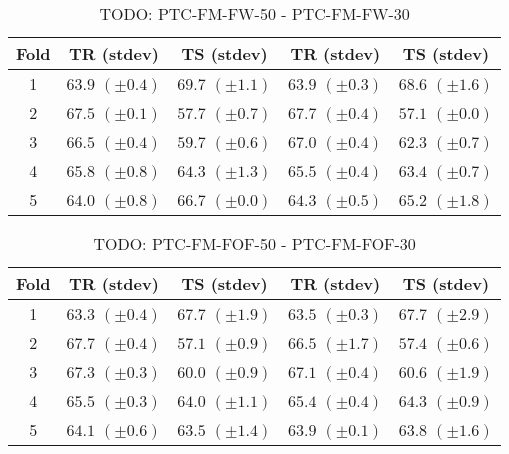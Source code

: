 \documentclass[10pt,a4paper]{book}
\begin{document}
\begin{table}[tbph]
\caption{TODO: PTC-FM-FW-50 - PTC-FM-FW-30}
\label{TODO}
\centering
\begin{tabular}{c*{4}{c}}
\toprule
Fold & TR (stdev) & TS (stdev) & TR (stdev) & TS (stdev)\\
\midrule
1 & $63.9$ $(\pm 0.4)$ & $69.7$ $(\pm 1.1)$ & $63.9$ $(\pm 0.3)$ & $68.6$ $(\pm 1.6)$\\
2 & $67.5$ $(\pm 0.1)$ & $57.7$ $(\pm 0.7)$ & $67.7$ $(\pm 0.4)$ & $57.1$ $(\pm 0.0)$\\
3 & $66.5$ $(\pm 0.4)$ & $59.7$ $(\pm 0.6)$ & $67.0$ $(\pm 0.4)$ & $62.3$ $(\pm 0.7)$\\
4 & $65.8$ $(\pm 0.8)$ & $64.3$ $(\pm 1.3)$ & $65.5$ $(\pm 0.4)$ & $63.4$ $(\pm 0.7)$\\
5 & $64.0$ $(\pm 0.8)$ & $66.7$ $(\pm 0.0)$ & $64.3$ $(\pm 0.5)$ & $65.2$ $(\pm 1.8)$\\
\bottomrule
\end{tabular}
\end{table}



\begin{table}[tbph]
\caption{TODO: PTC-FM-FOF-50 - PTC-FM-FOF-30}
\label{TODO}
\centering
\begin{tabular}{c*{4}{c}}
\toprule
Fold & TR (stdev) & TS (stdev) & TR (stdev) & TS (stdev)\\
\midrule
1 & $63.3$ $(\pm 0.4)$ & $67.7$ $(\pm 1.9)$ & $63.5$ $(\pm 0.3)$ & $67.7$ $(\pm 2.9)$\\
2 & $67.7$ $(\pm 0.4)$ & $57.1$ $(\pm 0.9)$ & $66.5$ $(\pm 1.7)$ & $57.4$ $(\pm 0.6)$\\
3 & $67.3$ $(\pm 0.3)$ & $60.0$ $(\pm 0.9)$ & $67.1$ $(\pm 0.4)$ & $60.6$ $(\pm 1.9)$\\
4 & $65.5$ $(\pm 0.3)$ & $64.0$ $(\pm 1.1)$ & $65.4$ $(\pm 0.4)$ & $64.3$ $(\pm 0.9)$\\
5 & $64.1$ $(\pm 0.6)$ & $63.5$ $(\pm 1.4)$ & $63.9$ $(\pm 0.1)$ & $63.8$ $(\pm 1.6)$\\
\bottomrule
\end{tabular}
\end{table}





\end{document}
